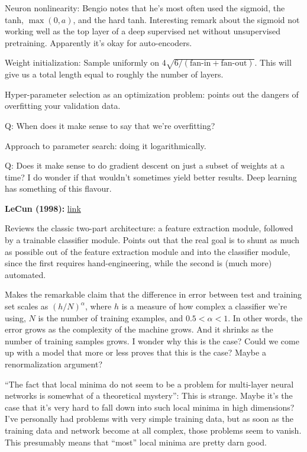 \documentclass[12pt]{article}
\newcommand{\link}[2]{\href{#1}{#2}}
\begin{document}
Neuron nonlinearity: Bengio notes that he's most often used the
sigmoid, the tanh, $\max(0, a)$, and the hard tanh.  Interesting
remark about the sigmoid not working well as the top layer of a deep
supervised net without unsupervised pretraining.  Apparently it's okay
for auto-encoders.

Weight initialization: Sample uniformly on
$4\sqrt{6/(\mbox{fan-in}+\mbox{fan-out})}$.  This will give us a total
length equal to roughly the number of layers.

Hyper-parameter selection as an optimization problem: points out the
dangers of overfitting your validation data.

Q: When does it make sense to say that we're overfitting?

Approach to parameter search: doing it logarithmically.

Q: Does it make sense to do gradient descent on just a subset of
weights at a time? I do wonder if that wouldn't sometimes yield better
results.  Deep learning has something of this flavour.


\textbf{LeCun (1998):}
\link{http://yann.lecun.com/exdb/publis/index.html\#lecun-98}{link}

Reviews the classic two-part architecture: a feature extraction
module, followed by a trainable classifier module.  Points out that
the real goal is to shunt as much as possible out of the feature
extraction module and into the classifier module, since the first
requires hand-engineering, while the second is (much more) automated.

Makes the remarkable claim that the difference in error between test
and training set scales as $(h/N)^\alpha$, where $h$ is a measure of
how complex a classifier we're using, $N$ is the number of training
examples, and $0.5 < \alpha < 1$.  In other words, the error grows as
the complexity of the machine grows.  And it shrinks as the number of
training samples grows.  I wonder why this is the case?  Could we come
up with a model that more or less proves that this is the case?  Maybe
a renormalization argument?

``The fact that local minima do not seem to be a problem for
multi-layer neural networks is somewhat of a theoretical mystery'':
This is strange.  Maybe it's the case that it's very hard to fall down
into such local minima in high dimensions? I've personally had
problems with very simple training data, but as soon as the training
data and network become at all complex, those problems seem to vanish.
This presumably means that ``most'' local minima are pretty darn good.
\end{document}
